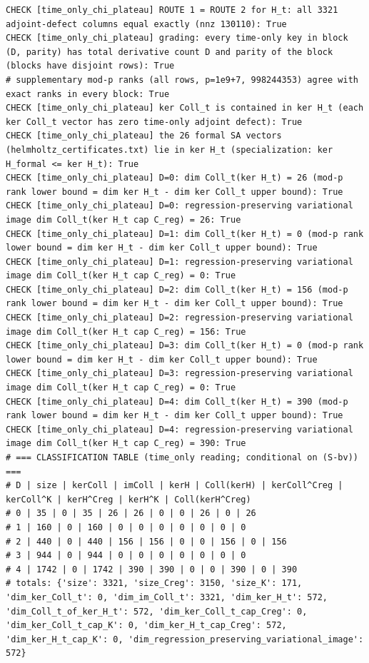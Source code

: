 \documentclass{article}
\theoremstyle{remark}
\begin{document}
\begin{lstlisting}
CHECK [time_only_chi_plateau] ROUTE 1 = ROUTE 2 for H_t: all 3321 adjoint-defect columns equal exactly (nnz 130110): True
CHECK [time_only_chi_plateau] grading: every time-only key in block (D, parity) has total derivative count D and parity of the block (blocks have disjoint rows): True
# supplementary mod-p ranks (all rows, p=1e9+7, 998244353) agree with exact ranks in every block: True
CHECK [time_only_chi_plateau] ker Coll_t is contained in ker H_t (each ker Coll_t vector has zero time-only adjoint defect): True
CHECK [time_only_chi_plateau] the 26 formal SA vectors (helmholtz_certificates.txt) lie in ker H_t (specialization: ker H_formal <= ker H_t): True
CHECK [time_only_chi_plateau] D=0: dim Coll_t(ker H_t) = 26 (mod-p rank lower bound = dim ker H_t - dim ker Coll_t upper bound): True
CHECK [time_only_chi_plateau] D=0: regression-preserving variational image dim Coll_t(ker H_t cap C_reg) = 26: True
CHECK [time_only_chi_plateau] D=1: dim Coll_t(ker H_t) = 0 (mod-p rank lower bound = dim ker H_t - dim ker Coll_t upper bound): True
CHECK [time_only_chi_plateau] D=1: regression-preserving variational image dim Coll_t(ker H_t cap C_reg) = 0: True
CHECK [time_only_chi_plateau] D=2: dim Coll_t(ker H_t) = 156 (mod-p rank lower bound = dim ker H_t - dim ker Coll_t upper bound): True
CHECK [time_only_chi_plateau] D=2: regression-preserving variational image dim Coll_t(ker H_t cap C_reg) = 156: True
CHECK [time_only_chi_plateau] D=3: dim Coll_t(ker H_t) = 0 (mod-p rank lower bound = dim ker H_t - dim ker Coll_t upper bound): True
CHECK [time_only_chi_plateau] D=3: regression-preserving variational image dim Coll_t(ker H_t cap C_reg) = 0: True
CHECK [time_only_chi_plateau] D=4: dim Coll_t(ker H_t) = 390 (mod-p rank lower bound = dim ker H_t - dim ker Coll_t upper bound): True
CHECK [time_only_chi_plateau] D=4: regression-preserving variational image dim Coll_t(ker H_t cap C_reg) = 390: True
# === CLASSIFICATION TABLE (time_only reading; conditional on (S-bv)) ===
# D | size | kerColl | imColl | kerH | Coll(kerH) | kerColl^Creg | kerColl^K | kerH^Creg | kerH^K | Coll(kerH^Creg)
# 0 | 35 | 0 | 35 | 26 | 26 | 0 | 0 | 26 | 0 | 26
# 1 | 160 | 0 | 160 | 0 | 0 | 0 | 0 | 0 | 0 | 0
# 2 | 440 | 0 | 440 | 156 | 156 | 0 | 0 | 156 | 0 | 156
# 3 | 944 | 0 | 944 | 0 | 0 | 0 | 0 | 0 | 0 | 0
# 4 | 1742 | 0 | 1742 | 390 | 390 | 0 | 0 | 390 | 0 | 390
# totals: {'size': 3321, 'size_Creg': 3150, 'size_K': 171, 'dim_ker_Coll_t': 0, 'dim_im_Coll_t': 3321, 'dim_ker_H_t': 572, 'dim_Coll_t_of_ker_H_t': 572, 'dim_ker_Coll_t_cap_Creg': 0, 'dim_ker_Coll_t_cap_K': 0, 'dim_ker_H_t_cap_Creg': 572, 'dim_ker_H_t_cap_K': 0, 'dim_regression_preserving_variational_image': 572}

\end{lstlisting}
\end{document}
